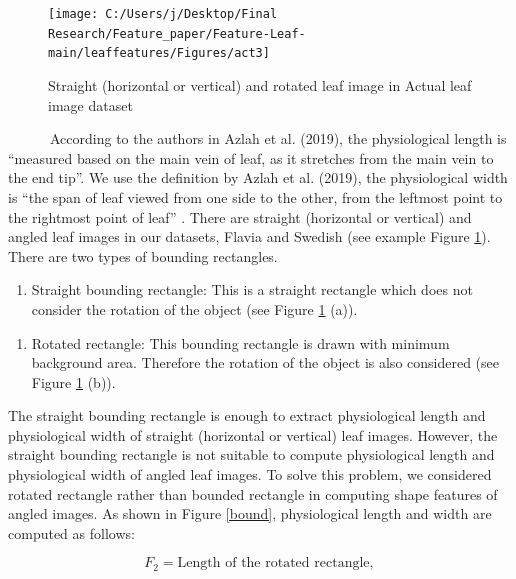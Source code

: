 \documentclass{article}
\begin{document}
\begin{figure}[!ht]

{\centering \texttt{[image: C:/Users/j/Desktop/Final Research/Feature\_paper/Feature-Leaf-main/leaffeatures/Figures/act3]} 

}

\caption{\label{act3}Straight (horizontal or vertical) and rotated leaf image in Actual leaf image dataset}\label{fig:act3}
\end{figure}

~~~~~~According to the authors in Azlah et al. (2019), the physiological
length is ``measured based on the main vein of leaf, as it stretches
from the main vein to the end tip''. We use the definition by Azlah et
al. (2019), the physiological width is ``the span of leaf viewed from
one side to the other, from the leftmost point to the rightmost point of
leaf'' . There are straight (horizontal or vertical) and angled leaf
images in our datasets, Flavia and Swedish (see example Figure
\ref{fig:act3}). There are two types of bounding rectangles.

\begin{enumerate}
\def\labelenumi{\roman{enumi})}
\tightlist
\item
  Straight bounding rectangle: This is a straight rectangle which does
  not consider the rotation of the object (see Figure \ref{fig:act3}
  (a)).
\end{enumerate}

\begin{enumerate}
\def\labelenumi{\roman{enumi})}
\setcounter{enumi}{1}
\tightlist
\item
  Rotated rectangle: This bounding rectangle is drawn with minimum
  background area. Therefore the rotation of the object is also
  considered (see Figure \ref{fig:act3} (b)).
\end{enumerate}

The straight bounding rectangle is enough to extract physiological
length and physiological width of straight (horizontal or vertical) leaf
images. However, the straight bounding rectangle is not suitable to
compute physiological length and physiological width of angled leaf
images. To solve this problem, we considered rotated rectangle rather
than bounded rectangle in computing shape features of angled images. As
shown in Figure \ref{bound}, physiological length and width are computed
as follows:

\begin{equation}
   F_2 = \text{Length of the rotated rectangle},
\label{equa_F2}
\end{equation}
\end{document}
